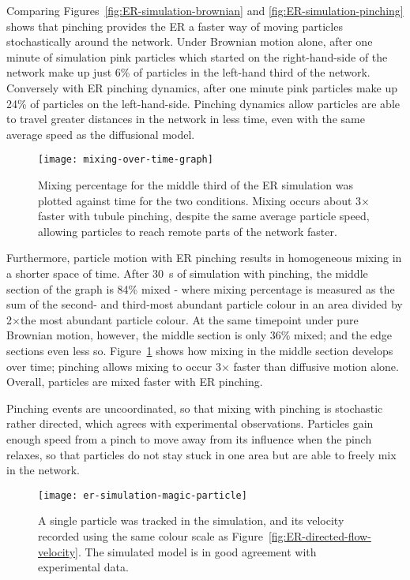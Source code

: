 Comparing Figures~\ref{fig:ER-simulation-brownian} and \ref{fig:ER-simulation-pinching} shows that pinching provides the ER a faster way of moving particles stochastically around the network. 
Under Brownian motion alone, after one minute of simulation pink particles which started on the right-hand-side of the network make up just 6\% of particles in the left-hand third of the network. 
Conversely with ER pinching dynamics, after one minute pink particles make up 24\% of particles on the left-hand-side. 
Pinching dynamics allow particles are able to travel greater distances in the network in less time, even with the same average speed as the diffusional model. 

\begin{figure}[htbp!]
	\centering
	\texttt{[image: mixing-over-time-graph]}
	\caption[ER simulation: Tubule pinching provides faster mixing than Brownian motion alone]{Mixing percentage for the middle third of the ER simulation was plotted against time for the two conditions. Mixing occurs about 3$\times$ faster with tubule pinching, despite the same average particle speed, allowing particles to reach remote parts of the network faster.}
	\label{fig:mixing-over-time-graph}
\end{figure}

Furthermore, particle motion with ER pinching results in homogeneous mixing in a shorter space of time. 
After \SI{30}{\second} of simulation with pinching, the middle section of the graph is 84\% mixed - where mixing percentage is measured as the sum of the second- and third-most abundant particle colour in an area divided by 2$\times$the most abundant particle colour. 
At the same timepoint under pure Brownian motion, however, the middle section is only 36\% mixed; and the edge sections even less so. 
Figure~\ref{fig:mixing-over-time-graph} shows how mixing in the middle section develops over time; pinching allows mixing to occur 3$\times$ faster than diffusive motion alone. 
Overall, particles are mixed faster with ER pinching. 

Pinching events are uncoordinated, so that mixing with pinching is stochastic rather directed, which agrees with experimental observations. 
Particles gain enough speed from a pinch to move away from its influence when the pinch relaxes, so that particles do not stay stuck in one area but are able to freely mix in the network. 
 
\begin{figure}[htbp!]
	\centering
	\texttt{[image: er-simulation-magic-particle]}
	\caption[ER simulation: The simulated model shows similar particle velocity tracks to experimental data]{A single particle was tracked in the simulation, and its velocity recorded using the same colour scale as Figure~\ref{fig:ER-directed-flow-velocity}. The simulated model is in good agreement with experimental data. }
	\label{fig:ER-simulation-magic-particle}
\end{figure}

